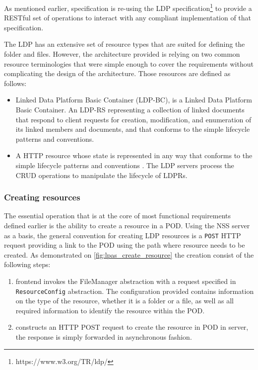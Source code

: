 As mentioned earlier,  \solid{} specification is re-using the LDP specification\footnote{https://www.w3.org/TR/ldp/}  to provide a RESTful set of operations to interact with any compliant implementation of that specification. 

The LDP has an extensive set of resource types that are suited for defining the folder and files. However, the architecture provided is relying on two common resource terminologies that were simple enough to cover the requirements without complicating the design of the architecture. Those resources are defined as follows:

\begin{itemize}
     \item Linked Data Platform Basic Container (LDP-BC), is a Linked Data Platform Basic Container. An LDP-RS representing a collection of linked documents that respond to client requests for creation, modification, and enumeration of its linked members and documents, and that conforms to the simple lifecycle patterns and conventions.
    \item A HTTP resource whose state is represented in any way that conforms to the simple lifecycle patterns and conventions . The LDP servers process the CRUD operations to manipulate the lifecycle of LDPRs.
\end{itemize}


\subsubsection{Creating resources}

The essential operation that is at the core of most functional requirements defined earlier is the ability to create a resource in a POD. Using the NSS server as a basis, the general convention for creating LDP resources is a \texttt{POST} HTTP request providing a link to the POD using the path where resource needs to be created. As demonstrated on \autoref{fig:lpas_create_resource} the creation consist of the following steps:
\begin{enumerate}
    \item \lpa{} frontend invokes the FileManager abstraction with a request specified in \texttt{ResourceConfig} abstraction. The configuration provided contains information on the type of the resource, whether it is a folder or a file, as well as all required information to identify the resource within the POD.
    \item \lpas{} constructs an HTTP POST request to create the resource in POD in \solid{} server, the response is simply forwarded in asynchronous fashion.
\end{enumerate}

